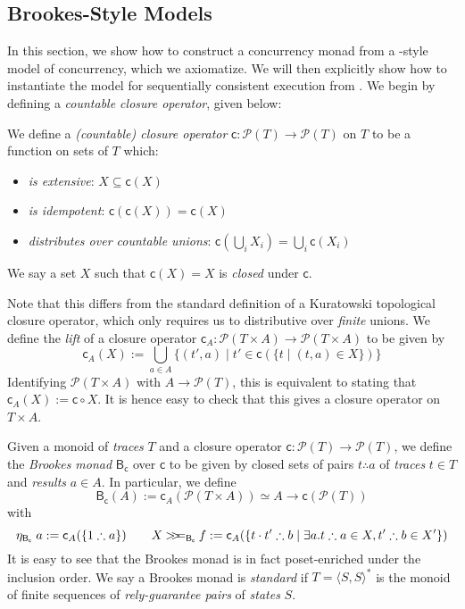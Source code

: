 \documentclass[acmsmall,screen,review]{acmart}
\newcommand{\mc}[1]{\ensuremath{\mathcal{#1}}}
\newcommand{\ms}[1]{\ensuremath{\mathsf{#1}}}
\newcommand{\obind}{\mathbin{>\!\!>\mkern-6.7mu=}}
\newcommand{\mbind}[3]{#2 \obind_{#1} #3}
\newcommand{\tret}[2]{#1 \therefore #2}
\begin{document}
\subsection{Brookes-Style Models}

\label{apx:rel-acq}

In this section, we show how to construct a concurrency monad from a
\citet{brookes-full-abstraction-96}-style model of concurrency, which we axiomatize. We will then
explicitly show how to instantiate the model for sequentially consistent execution from
\citet{brookes-full-abstraction-96}. We begin by defining a \emph{countable closure operator}, given
below:
\begin{definition}
  We define a \emph{(countable) closure operator} $\ms{c}: \mc{P}(T) \to \mc{P}(T)$ on $T$ to be a
  function on sets of $T$ which:
  \begin{itemize}
    \item \emph{is extensive}: $X \subseteq \ms{c}(X)$
    \item \emph{is idempotent}: $\ms{c}(\ms{c}(X)) = \ms{c}(X)$
    \item \emph{distributes over countable unions}: $\ms{c}(\bigcup_i X_i) = \bigcup_i \ms{c}(X_i)$
  \end{itemize}
  We say a set $X$ such that $\ms{c}(X) = X$ is \emph{closed} under $\ms{c}$. 
\end{definition}
Note that this differs from the standard definition of a Kuratowski topological closure operator,
which only requires us to distributive over \emph{finite} unions. We define the \emph{lift} of a
closure operator $\ms{c}_A : \mc{P}(T \times A) \to \mc{P}(T \times A)$ to be given by
\begin{equation*}
  \ms{c}_A(X) := \bigcup_{a \in A}\{(t', a) \mid t' \in \ms{c}(\{t \mid (t, a) \in X\})\}
\end{equation*}
Identifying $\mc{P}(T \times A)$ with $A \to \mc{P}(T)$, this is equivalent to stating that
$\ms{c}_A(X) := \ms{c} \circ X$. It is hence easy to check that this gives a closure operator on $T
\times A$.
\begin{definition}
  Given a monoid of \emph{traces} $T$ and a closure operator $\ms{c}: \mc{P}(T) \to \mc{P}(T)$, we
  define the \emph{Brookes monad} $\ms{B}_{\ms{c}}$ over $\ms{c}$ to be given by closed sets of
  pairs $\tret{t}{a}$ of \emph{traces} $t \in T$ and \emph{results} $a \in A$. In particular, we
  define
  $$
  \ms{B}_{\ms{c}}(A) := \ms{c}_A(\mc{P}(T \times A)) \simeq A \to \ms{c}(\mc{P}(T))
  $$
  with
  $$
  \eta_{\ms{B}_{\ms{c}}}\;a := \ms{c}_A(\{\tret{1}{a}\}) \qquad
  \mbind{\ms{B}_{\ms{c}}}{X}{f} 
  := \ms{c}_A(\{\tret{t \cdot t'}{b} \mid \exists a . \tret{t}{a} \in X, \tret{t'}{b} \in X'\})
  $$
  It is easy to see that the Brookes monad is in fact poset-enriched under the inclusion order. We
  say a Brookes monad is \emph{standard} if $T = \langle S, S \rangle^*$ is the monoid of finite
  sequences of \emph{rely-guarantee pairs} of \emph{states} $S$.
\end{definition}
\end{document}

